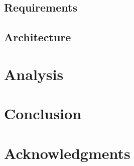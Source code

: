 \documentclass[10pt, conference, compsocconf]{IEEEtran}
\begin{document}
\subsection{Requirements}


\subsection{Architecture}


\begin{comment}

SAMPLE IMAGE

\begin{figure}[htb] 
  \centering 
    \texttt{[image: images-new/objectives.pdf]} 
    \caption{High level Objectives impacting the design of our framework}
    \label{F:objectives}
\end{figure} 

\end{comment}

\section{Analysis}





\section{Conclusion} \label{S:conclusion}





\section{Acknowledgments}

 

% 


\end{document}
